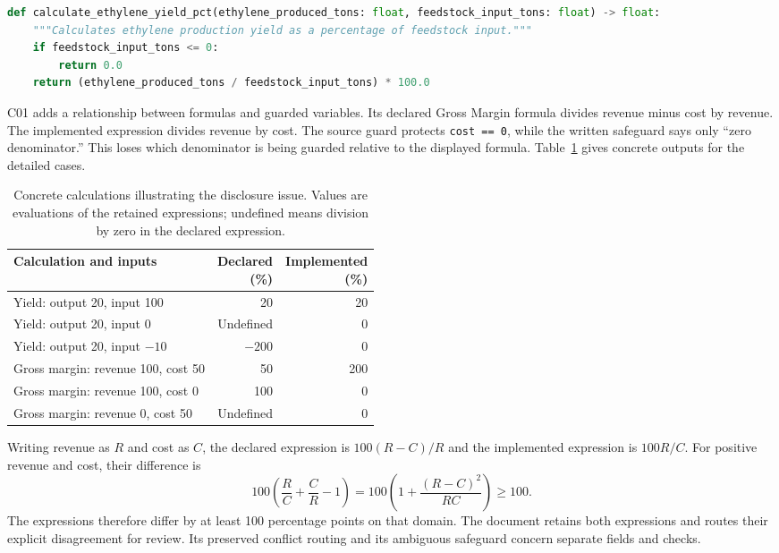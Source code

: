 \documentclass[a4paper,fleqn]{cas-dc}
\begin{document}
\begin{lstlisting}[float=tbp,label={lst:yield},language=Python,breaklines=true,breakatwhitespace=true,caption={Retained source for Ethylene Production Yield (C12). The non-positive-input branch is absent from the document's safeguard field.}]
def calculate_ethylene_yield_pct(ethylene_produced_tons: float, feedstock_input_tons: float) -> float:
    """Calculates ethylene production yield as a percentage of feedstock input."""
    if feedstock_input_tons <= 0:
        return 0.0
    return (ethylene_produced_tons / feedstock_input_tons) * 100.0
\end{lstlisting}

C01 adds a relationship between formulas and guarded variables. Its declared Gross Margin formula divides revenue minus cost by revenue. The implemented expression divides revenue by cost. The source guard protects \texttt{cost == 0}, while the written safeguard says only ``zero denominator.'' This loses which denominator is being guarded relative to the displayed formula. Table~\ref{tab:worked} gives concrete outputs for the detailed cases.

\begin{table}[t]
\centering
\caption{Concrete calculations illustrating the disclosure issue. Values are evaluations of the retained expressions; undefined means division by zero in the declared expression.}
\label{tab:worked}
\begin{tabularx}{\columnwidth}{@{}Xrr@{}}
\toprule
Calculation and inputs & \shortstack{Declared\\(\%)} & \shortstack{Implemented\\(\%)} \\
\midrule
Yield: output 20, input 100 & 20 & 20 \\
Yield: output 20, input 0 & Undefined & 0 \\
Yield: output 20, input $-10$ & $-200$ & 0 \\
Gross margin: revenue 100, cost 50 & 50 & 200 \\
Gross margin: revenue 100, cost 0 & 100 & 0 \\
Gross margin: revenue 0, cost 50 & Undefined & 0 \\
\bottomrule
\end{tabularx}
\end{table}

Writing revenue as $R$ and cost as $C$, the declared expression is $100(R-C)/R$ and the implemented expression is $100R/C$. For positive revenue and cost, their difference is
\[
100\left(\frac{R}{C}+\frac{C}{R}-1\right)
=100\left(1+\frac{(R-C)^2}{RC}\right)\ge100.
\]
The expressions therefore differ by at least 100 percentage points on that domain. The document retains both expressions and routes their explicit disagreement for review. Its preserved conflict routing and its ambiguous safeguard concern separate fields and checks.
\end{document}

